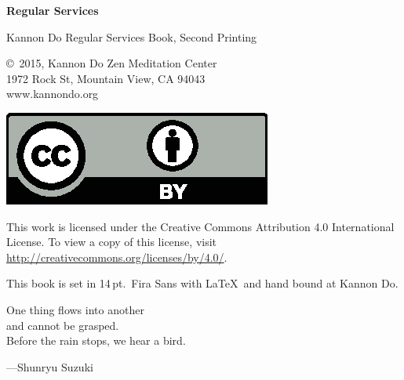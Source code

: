\documentclass{chantbook}
\begin{document}

\frontmatter
\begin{titlepage}
{\Huge\bf Regular Services}
\end{titlepage}

\begin{colophon}
Kannon Do Regular Services Book, Second Printing

\bigskip

\copyright\ 2015, Kannon Do Zen Meditation Center\\
1972 Rock St, Mountain View, CA 94043\\
www.kannondo.org

\includegraphics{by}

This work is licensed under the Creative Commons Attribution 4.0 International
License. To view a copy of this license, visit
\url{http://creativecommons.org/licenses/by/4.0/}.

\bigskip

This book is set in 14\,pt.\ Fira Sans with \LaTeX\ and hand bound at Kannon Do.
\end{colophon}

\begin{dedication}
One thing flows into another\\
and cannot be grasped.\\
Before the rain stops, we hear a bird.

---Shunryu Suzuki
\end{dedication}

\cleardoublepage

\tableofcontents
\end{document}
